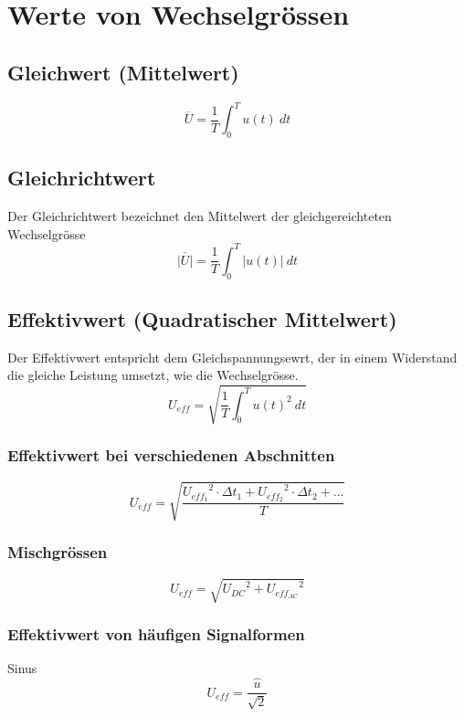 



\section{Werte von Wechselgrössen}

\subsection{Gleichwert (Mittelwert)}
\[ \overline{U} = \frac{1}{T} \int_0^T u(t) ~ dt \]

\subsection{Gleichrichtwert}
Der Gleichrichtwert bezeichnet den Mittelwert der gleichgereichteten 
Wechselgrösse
\[ \overline{|U|} = \frac{1}{T} \int_0^T |u(t)| ~ dt \]

\subsection{Effektivwert (Quadratischer Mittelwert)}
Der Effektivwert entspricht dem Gleichspannungsewrt, der in einem Widerstand 
die gleiche Leistung umsetzt, wie die Wechselgrösse. 
\[ U_{eff} = \sqrt{\frac{1}{T} \int_0^T u(t)^2 ~ dt} \]

\subsubsection{Effektivwert bei verschiedenen Abschnitten}
\[ U_{eff} = \sqrt{\frac{{U_{eff_1}}^2 \cdot \Delta t_1 
+ {U_{eff_2}}^2 \cdot \Delta t_2 + \dots}{T}} \]

\subsubsection{Mischgrössen}
\[ U_{eff} = \sqrt{{U_{DC}}^2 + {U_{eff_{AC}}}^2} \]

\subsubsection{Effektivwert von häufigen Signalformen}
Sinus
\[ U_{eff} = \frac{\hat{u}}{\sqrt{2}} \]

